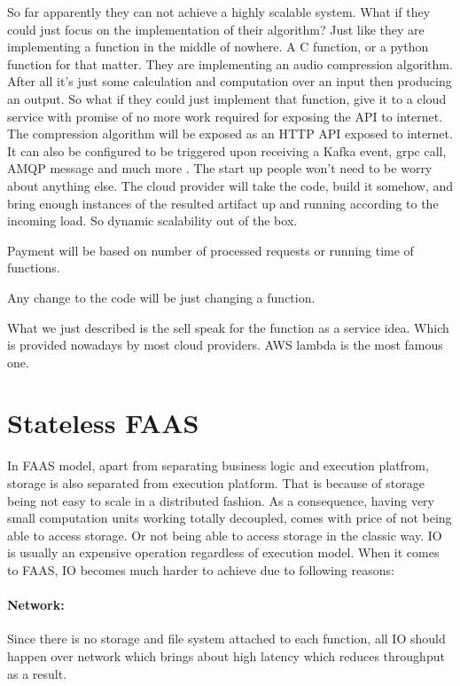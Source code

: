 \documentclass[a4]{report}
\begin{document}
    So far apparently they can not achieve a highly scalable system.
    What if they could just focus on the implementation of their algorithm?
    Just like they are implementing a function in the middle of nowhere.
    A C function, or a python function for that matter.
    They are implementing an audio compression algorithm.
    After all it's just some calculation and computation over an input then producing an output.
    So what if they could just implement that function, give it to a cloud service with promise of no more work
    required for exposing the API to internet.
    The compression algorithm will be exposed as an HTTP API exposed to internet.
    It can also be configured to be triggered upon receiving a Kafka event, grpc call, AMQP message and much more .
    The start up people won't need to be worry about anything else.
    The cloud provider will take the code, build it somehow, and bring enough instances of the resulted artifact up and
    running according to the incoming load.
    So dynamic scalability out of the box.

    Payment will be based on number of processed requests or running time of functions.

    Any change to the code will be just changing a function.

    What we just described is the sell speak for the function as a service idea.
    Which is provided nowadays by most cloud providers.
    AWS lambda is the most famous one.

    \section{Stateless FAAS}
    In FAAS model, apart from separating business logic and execution platfrom, storage is also separated from
    execution platform.
    That is because of storage being not easy to scale in a distributed fashion.
    As a consequence, having very small computation units working totally decoupled, comes with price of not being
    able to access storage.
    Or not being able to access storage in the classic way.
    IO is usually an expensive operation regardless of execution model.
    When it comes to FAAS, IO becomes much harder to achieve due to following reasons:

    \paragraph{Network:} Since there is no storage and file system attached to each function, all IO should happen
    over network which brings about high latency which reduces throughput as a result.
\end{document}
